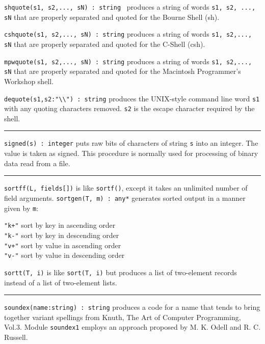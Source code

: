 \texttt{shquote(s1, s2,..., sN) : string} \ produces a string of words
\texttt{s1, s2, ..., sN} that are properly separated and quoted for the
Bourne Shell (sh).

\texttt{cshquote(s1, s2,..., sN) : string} produces a string of words
\texttt{s1, s2,..., sN} that are properly separated and quoted for the
C-Shell (csh).

\texttt{mpwquote(s1, s2,..., sN) : string} produces a string of words
\texttt{s1, s2,..., sN} that are properly separated and quoted for the
Macintosh Programmer's Workshop shell.

\texttt{dequote(s1,s2:"{\textbackslash}{\textbackslash}")
: string} produces the UNIX-style command line word \texttt{s1} with
any quoting characters removed. \texttt{s2} is the escape character
required by the shell.

\vspace{0.25cm}\hrule{}

\texttt{signed(s) : integer} puts raw bits of characters of string
\texttt{s} into an integer. The value is taken as signed. This
procedure is normally used for processing of binary data read from a
file.

\vspace{0.25cm}\hrule{}

\texttt{sort}\texttt{ff(L, fields[])} is like
\texttt{sortf()}, except it takes an unlimited number of field arguments. \texttt{sortgen(T, m) : any*} generates sorted
output in a manner given by \texttt{m}:

\texttt{"k+"} sort by key in ascending
order\\
\texttt{"k-"} sort by key in descending
order\\
\texttt{"v+"} sort by value in ascending
order\\
\texttt{"v-"} sort by value in descending
order

\texttt{sortt}\texttt{(T, i)} is like \texttt{sort(T, i)}
but produces a list of two-element records instead of a list of
two-element lists.

\vspace{0.25cm}\hrule{}

\texttt{soundex(name:string) : string} produces a code for a name that
tends to bring together variant spellings from Knuth, The Art
of Computer Programming, Vol.3.
Module \texttt{soundex1} employs an approach proposed by M. K.
Odell and R. C. Russell.

